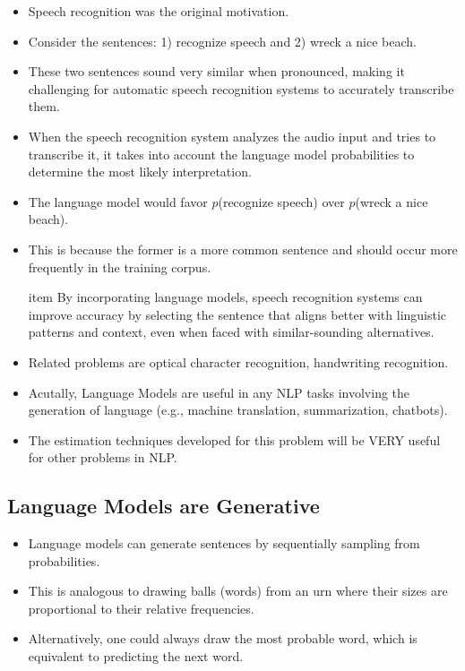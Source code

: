 \documentclass{book}
\begin{document}
\begin{itemize}
\item Speech recognition was the original motivation.

\item Consider the sentences: 1) recognize speech and 2) wreck a nice beach.

\item   These two sentences sound very similar when pronounced, making it challenging for automatic speech recognition systems to accurately transcribe them.
    
    
\item When the speech recognition system analyzes the audio input and tries to transcribe it, it takes into account the language model probabilities to determine the most likely interpretation.
    
\item The language model would favor $p$(recognize speech) over $p$(wreck a nice beach).

\item This is because the former is a more common sentence and should occur more frequently in the training corpus.
    
item By incorporating language models, speech recognition systems can improve accuracy by selecting the sentence that aligns better with linguistic patterns and context, even when faced with similar-sounding alternatives.



\item Related problems are optical character recognition, handwriting recognition.

\item Acutally, Language Models are useful in any NLP tasks involving the generation of language (e.g., machine translation, summarization, chatbots).

\item The estimation techniques developed for this problem will be VERY useful for other problems in NLP.

    
\end{itemize}



\subsection{Language Models are Generative}
\begin{itemize}
 \item Language models can generate sentences by sequentially sampling from probabilities.

  \item This is analogous to drawing balls (words) from an urn where their sizes are proportional to their relative frequencies.

 \item Alternatively, one could always draw the most probable word, which is equivalent to predicting the next word.
\end{itemize}
\end{document}
